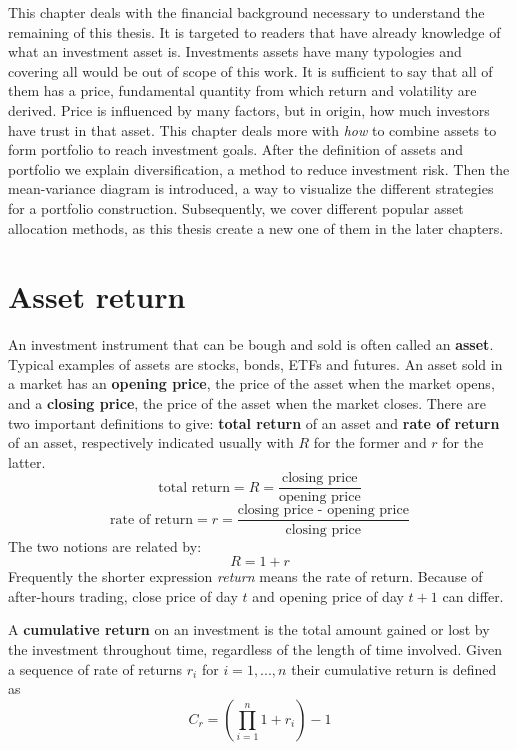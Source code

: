 This chapter deals with the financial background necessary to understand the remaining of this thesis. It is targeted to readers that have already knowledge of what an investment asset is. Investments assets have many typologies and covering all would be out of scope of this work. It is sufficient to say that all of them has a price, fundamental quantity from which return and volatility are derived. Price is influenced by many factors, but in origin, how much investors have trust in that asset. This chapter deals more with \textit{how} to combine assets to form portfolio to reach investment goals. After the definition of assets and portfolio we explain diversification, a method to reduce investment risk. Then the mean-variance diagram is introduced, a way to visualize the different strategies for a portfolio construction. Subsequently, we cover different popular asset allocation methods, as this thesis create a new one of them in the later chapters.

\section{Asset return}
\label{s:asset_return}

An investment instrument that can be bough and sold is often called an \textbf{asset}.
Typical examples of assets are stocks, bonds, ETFs and futures.
An asset sold in a market has an \textbf{opening price}, the price of the asset when the market opens, and a \textbf{closing price}, the price of the asset when the market closes.
There are two important definitions to give: \textbf{total return} of an asset and \textbf{rate of return} of an asset, respectively indicated usually with $R$ for the former and $r$ for the latter. 
$$ \text{total return} = R = \frac{\text{closing price}}{\text{opening price}} $$
$$ \text{rate of return} = r = \frac{\text{closing price - opening price}}{\text{closing price}} $$
The two notions are related by:
$$ R = 1 + r $$
Frequently the shorter expression \textit{return} means the rate of return.
Because of after-hours trading, close price of day $t$ and opening price of day $t+1$ can differ.

A \textbf{cumulative return} on an investment is the total amount gained or lost by the investment throughout time, regardless of the length of time involved.
Given a sequence of rate of returns $r_i$ for $i=1,...,n$ their cumulative return is defined as
$$ C_r = \left( \prod_{i=1}^n 1+r_i \right) - 1 $$

\hfill \break

